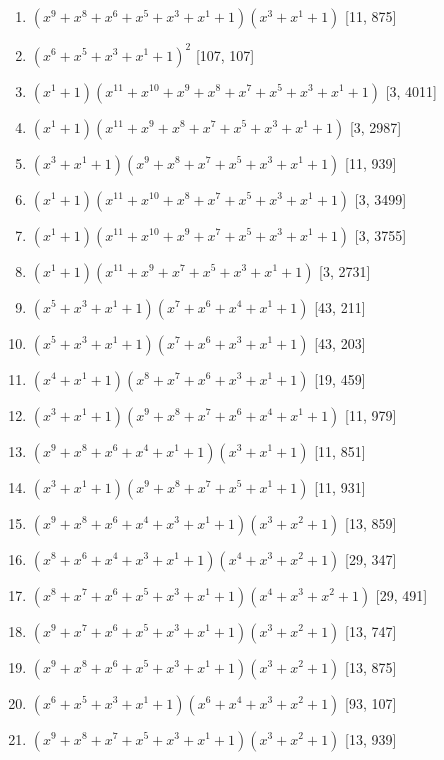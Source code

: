 \documentclass[10pt,twocolumn]{article}
\begin{document}
\begin{enumerate}
\item $(x^{9} + x^{8} + x^{6} + x^{5} + x^{3} + x^{1} + 1)(x^{3} + x^{1} + 1)$  [11, 875]
\item $(x^{6} + x^{5} + x^{3} + x^{1} + 1)^{2}$  [107, 107]
\item $(x^{1} + 1)(x^{11} + x^{10} + x^{9} + x^{8} + x^{7} + x^{5} + x^{3} + x^{1} + 1)$  [3, 4011]
\item $(x^{1} + 1)(x^{11} + x^{9} + x^{8} + x^{7} + x^{5} + x^{3} + x^{1} + 1)$  [3, 2987]
\item $(x^{3} + x^{1} + 1)(x^{9} + x^{8} + x^{7} + x^{5} + x^{3} + x^{1} + 1)$  [11, 939]
\item $(x^{1} + 1)(x^{11} + x^{10} + x^{8} + x^{7} + x^{5} + x^{3} + x^{1} + 1)$  [3, 3499]
\item $(x^{1} + 1)(x^{11} + x^{10} + x^{9} + x^{7} + x^{5} + x^{3} + x^{1} + 1)$  [3, 3755]
\item $(x^{1} + 1)(x^{11} + x^{9} + x^{7} + x^{5} + x^{3} + x^{1} + 1)$  [3, 2731]
\item $(x^{5} + x^{3} + x^{1} + 1)(x^{7} + x^{6} + x^{4} + x^{1} + 1)$  [43, 211]
\item $(x^{5} + x^{3} + x^{1} + 1)(x^{7} + x^{6} + x^{3} + x^{1} + 1)$  [43, 203]
\item $(x^{4} + x^{1} + 1)(x^{8} + x^{7} + x^{6} + x^{3} + x^{1} + 1)$  [19, 459]
\item $(x^{3} + x^{1} + 1)(x^{9} + x^{8} + x^{7} + x^{6} + x^{4} + x^{1} + 1)$  [11, 979]
\item $(x^{9} + x^{8} + x^{6} + x^{4} + x^{1} + 1)(x^{3} + x^{1} + 1)$  [11, 851]
\item $(x^{3} + x^{1} + 1)(x^{9} + x^{8} + x^{7} + x^{5} + x^{1} + 1)$  [11, 931]
\item $(x^{9} + x^{8} + x^{6} + x^{4} + x^{3} + x^{1} + 1)(x^{3} + x^{2} + 1)$  [13, 859]
\item $(x^{8} + x^{6} + x^{4} + x^{3} + x^{1} + 1)(x^{4} + x^{3} + x^{2} + 1)$  [29, 347]
\item $(x^{8} + x^{7} + x^{6} + x^{5} + x^{3} + x^{1} + 1)(x^{4} + x^{3} + x^{2} + 1)$  [29, 491]
\item $(x^{9} + x^{7} + x^{6} + x^{5} + x^{3} + x^{1} + 1)(x^{3} + x^{2} + 1)$  [13, 747]
\item $(x^{9} + x^{8} + x^{6} + x^{5} + x^{3} + x^{1} + 1)(x^{3} + x^{2} + 1)$  [13, 875]
\item $(x^{6} + x^{5} + x^{3} + x^{1} + 1)(x^{6} + x^{4} + x^{3} + x^{2} + 1)$  [93, 107]
\item $(x^{9} + x^{8} + x^{7} + x^{5} + x^{3} + x^{1} + 1)(x^{3} + x^{2} + 1)$  [13, 939]

\end{enumerate}
\end{document}
